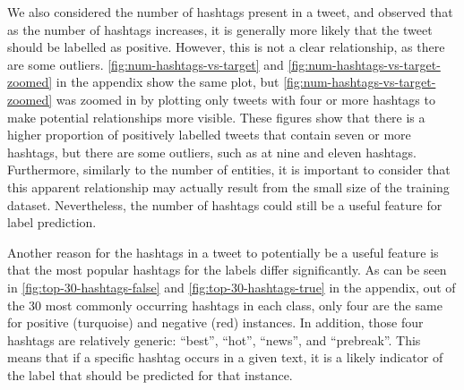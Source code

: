 We also considered the number of hashtags present in a tweet, and observed that as the number of hashtags increases, it is generally more likely that the tweet should be labelled as positive.
However, this is not a clear relationship, as there are some outliers.
\autoref{fig:num-hashtags-vs-target} and \autoref{fig:num-hashtags-vs-target-zoomed} in the appendix show the same plot, but \autoref{fig:num-hashtags-vs-target-zoomed} was zoomed in by plotting only tweets with four or more hashtags to make potential relationships more visible.
These figures show that there is a higher proportion of positively labelled tweets that contain seven or more hashtags, but there are some outliers, such as at nine and eleven hashtags.
Furthermore, similarly to the number of entities, it is important to consider that this apparent relationship may actually result from the small size of the training dataset.
Nevertheless, the number of hashtags could still be a useful feature for label prediction.

Another reason for the hashtags in a tweet to potentially be a useful feature is that the most popular hashtags for the labels differ significantly.
As can be seen in \autoref{fig:top-30-hashtags-false} and \autoref{fig:top-30-hashtags-true} in the appendix, out of the 30 most commonly occurring hashtags in each class, only four are the same for positive (turquoise) and negative (red) instances.
In addition, those four hashtags are relatively generic: ``best'', ``hot'', ``news'', and ``prebreak''.
This means that if a specific hashtag occurs in a given text, it is a likely indicator of the label that should be predicted for that instance.

